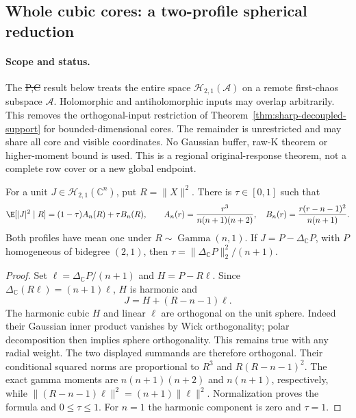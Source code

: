 \subsection{Whole cubic cores: a two-profile spherical reduction}
\label{sec:spherical-core-contact}

\paragraph{Scope and status.}
The \st{P,C} result below treats the entire space
$\mathcal H_{2,1}(\mathcal A)$ on a remote first-chaos subspace
$\mathcal A$. Holomorphic and antiholomorphic inputs may overlap
arbitrarily. This removes the orthogonal-input restriction of
Theorem~\ref{thm:sharp-decoupled-support} for bounded-dimensional
cores. The remainder is unrestricted and may share all core and
visible coordinates. No Gaussian buffer, raw-K theorem or higher-moment
bound is used. This is a regional original-response theorem, not a
complete row cover or a new global endpoint.

\begin{lemma}
\label{lem:spherical-cubic-profiles}
For a unit $J\in\mathcal H_{2,1}(\mathbb C^n)$, put $R=\|X\|^2$.
There is $\tau\in[0,1]$ such that
\begin{equation}\label{eq:spherical-cubic-profiles}
 \E[|J|^2\mid R]=(1-\tau)A_n(R)+\tau B_n(R),\qquad
 A_n(r)=\frac{r^3}{n(n+1)(n+2)},\quad
 B_n(r)=\frac{r(r-n-1)^2}{n(n+1)}.
\end{equation}
Both profiles have mean one under $R\sim\operatorname{Gamma}(n,1)$.
If $J=P-\Delta_{\mathbb C}P$, with $P$ homogeneous of bidegree $(2,1)$,
then $\tau=\|\Delta_{\mathbb C}P\|_2^2/(n+1)$.
\end{lemma}
\begin{proof}
Set $\ell=\Delta_{\mathbb C}P/(n+1)$ and $H=P-R\ell$.
Since $\Delta_{\mathbb C}(R\ell)=(n+1)\ell$, $H$ is harmonic and
\[
 J=H+(R-n-1)\ell.
\]
The harmonic cubic $H$ and linear $\ell$ are orthogonal on the
unit sphere. Indeed their Gaussian inner product vanishes by Wick
orthogonality; polar decomposition then implies sphere orthogonality.
This remains true with any radial weight. The two displayed summands
are therefore orthogonal. Their conditional squared norms are
proportional to $R^3$ and $R(R-n-1)^2$. The exact gamma moments are
$n(n+1)(n+2)$ and $n(n+1)$, respectively, while
$\|(R-n-1)\ell\|^2=(n+1)\|\ell\|^2$.
Normalization proves the formula and $0\le\tau\le1$.
For $n=1$ the harmonic component is zero and $\tau=1$.
\end{proof}

